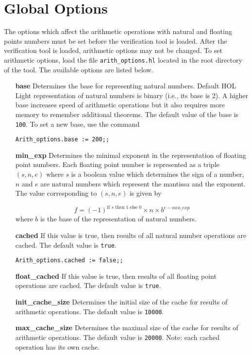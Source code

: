\documentclass[a4paper]{article}
\begin{document}
\section{Global Options}
The options which affect the arithmetic operations with natural and floating points numbers must be set before the verification tool is loaded. After the verification tool is loaded, arithmetic options may not be changed. To set arithmetic options, load the file \verb|arith_options.hl| located in the root directory of the tool. The available options are listed below.

\begin{enumerate}
\item[\bf base] Determines the base for representing natural numbers. Default HOL Light 
representation of natural numbers is binary (i.e., its base is 2). A higher base increases speed of arithmetic operations but it also requires more memory to remember additional theorems. The default value of the base is \verb|100|. To set a new base, use the command

\verb|Arith_options.base := 200;;|

\item[\bf min\_exp] Determines the minimal exponent in the representation of floating point numbers. Each floating point number is represented as a triple $(s, n, e)$ where $s$ is a boolean value which determines the sign of a number, $n$ and $e$ are natural numbers which represent the mantissa and the exponent. The value corresponding to $(s, n, e)$ is given by

\[f = (-1)^{\text{if $s$ then $1$ else $0$}} \times n \times b^{e - min\_exp}\]
where $b$ is the base of the representation of natural numbers.

\item[\bf cached] If this value is true, then results of all natural number operations are cached. The default value is \verb|true|.

\verb|Arith_options.cached := false;;|

\item[\bf float\_cached] If this value is true, then results of all floating point operations are cached. The default value is \verb|true|.

\item[\bf init\_cache\_size] Determines the initial size of the cache for results of arithmetic operations. The default value is \verb|10000|.

\item[\bf max\_cache\_size] Determines the maximal size of the cache for results of arithmetic operations. The default value is \verb|20000|. Note: each cached operation has its own cache.

\end{enumerate}
\end{document}
